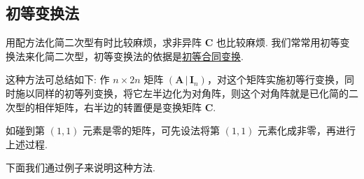 \documentclass[../../main.tex]{subfiles}%
\begin{document}
\subsection{初等变换法}

用配方法化简二次型有时比较麻烦，求非异阵 $\boldsymbol{C}$ 也比较麻烦. 我们常常用初等变换法来化简二次型，初等变换法的依据是\hyperref[lemma:初等合同变换]{初等合同变换}.

这种方法可总结如下: 作 $n\times 2n$ 矩阵 $(\boldsymbol{A}\,|\,\boldsymbol{I}_n)$，对这个矩阵实施初等行变换，同时施以同样的初等列变换，将它左半边化为对角阵，则这个对角阵就是已化简的二次型的相伴矩阵，右半边的转置便是变换矩阵 $\boldsymbol{C}$.

如碰到第 $(1,1)$ 元素是零的矩阵，可先设法将第 $(1,1)$ 元素化成非零，再进行上述过程. 

下面我们通过例子来说明这种方法.
\end{document}
